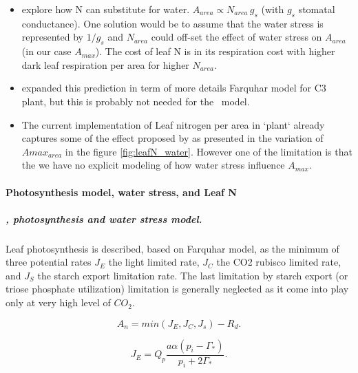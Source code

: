 \documentclass[a4paper,11pt]{article}
\begin{document}
\begin{itemize}
\item \citet{Wright-2003} explore how N can substitute for water. $A_{area} \propto N_{area} \, g_s$ (with $g_s$ stomatal conductance). One solution would be to assume that the water stress is represented by $1/g_s$ and $N_{area}$ could off-set the effect of water stress on $A_{area}$ (in our case $A_{max}$). The cost of leaf N is in its respiration cost with higher dark leaf respiration per area for higher $N_{area}$.

\item \citet{Prentice-2014} expanded this prediction in term of more details Farquhar model for C3 plant, but this is probably not needed for the \plant\ model.

\item The current implementation of Leaf nitrogen per area in `plant` already captures some of the effect proposed by \citet{Wright-2003} as presented in the variation of $A{max}_{area}$ in the figure \ref{fig:leafN_water}. However one of the limitation is that the we have no explicit modeling of how water stress influence $A_{max}$.
\end{itemize}

\paragraph{Photosynthesis model, water stress, and Leaf N}

\subparagraph{\citet{Collatz-1991}, photosynthesis and water stress model.}


Leaf photosynthesis is described, based on Farquhar model, as the minimum of three potential rates $J_E$ the light limited rate, $J_C$ the CO2 rubisco limited rate, and $J_S$ the starch export limitation rate. The last limitation by starch export (or triose phosphate utilization) limitation is generally neglected as it come into play only at very high level of $CO_2$.

\begin{equation}
\label{eq:An}
A_n= min(J_E, J_C, J_s) - R_d.
\end{equation}


\begin{equation}
\label{eq:JC}
J_E = Q_p \frac{a \alpha (p_i - \Gamma_*)}{p_i + 2 \Gamma_*}.
\end{equation}
\end{document}
